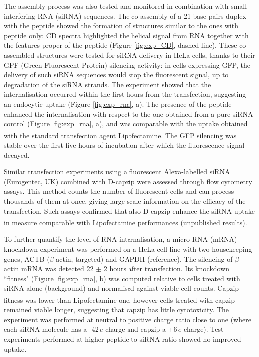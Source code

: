 The assembly process was also tested and monitored in combination with small interfering RNA (siRNA) sequences. The co-assembly of a 21 base pairs duplex with the peptide showed the formation of structures similar to the ones with peptide only: CD spectra highlighted the helical signal from RNA together with the features proper of the peptide (Figure \ref{fig:exp_CD}, dashed line).
%
These co-assembled structures were tested for siRNA delivery in HeLa cells, thanks to their GPF (Green Fluorescent Protein) silencing activity: in cells expressing GFP, the delivery of such siRNA sequences would stop the fluorescent signal, up to degradation of the siRNA strands. The experiment showed that the internalisation occurred within the first hours from the transfection, suggesting an endocytic uptake (Figure \ref{fig:exp_rna}, a). The presence of the peptide enhanced the internalisation with respect to the one obtained from a pure siRNA control (Figure \ref{fig:exp_rna}, a), and was comparable with the uptake obtained with the standard transfection agent Lipofectamine\textsuperscript{\textregistered}.
%
The GFP silencing was stable over the first five hours of incubation after which the fluorescence signal decayed. 

Similar transfection experiments using a fluorescent Alexa-labelled siRNA (Eurogentec, UK) combined with D-capzip were assessed through flow cytometry assays. This method counts the number of fluorescent cells and can process thousands of them at once, giving large scale information on the efficacy of the transfection. Such assays confirmed that also D-capzip enhance the siRNA uptake in measure comparable with Lipofectamine\textsuperscript{\textregistered} performances (unpublished results).

To further quantify the level of RNA internalisation, a micro RNA (mRNA) knockdown experiment was performed on a HeLa cell line with two housekeeping genes, ACTB ($\beta$-actin, targeted) and GAPDH (reference).
%
The silencing of $\beta$-actin mRNA was detected 22 $\pm$ 2 hours after transfection. Its knockdown ``fitness" (Figure \ref{fig:exp_rna}, b) was computed relative to cells treated with siRNA alone (background) and normalised against viable cell counts. Capzip fitness was lower than Lipofectamine\textsuperscript{\textregistered} one, however cells treated with capzip remained viable longer, suggesting that capzip has little cytotoxicity.
%
The experiment was performed at neutral to positive charge ratio close to one (where each siRNA molecule has a -42$\, e$ charge and capzip a +6$\, e$ charge). Test experiments performed at higher peptide-to-siRNA ratio showed no improved uptake.

